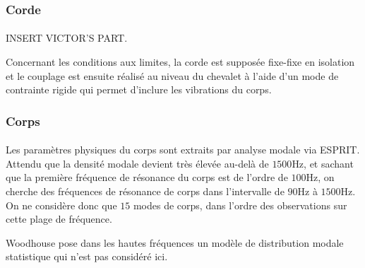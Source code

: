 \subsubsection{Corde}
  \paragraph{}
  \begin{huge}
    INSERT VICTOR'S PART.
  \end{huge}
  

  Concernant les conditions aux limites, la corde est supposée fixe-fixe
en isolation et le couplage est ensuite réalisé au niveau du chevalet à l'aide
d'un mode de contrainte rigide qui permet d'inclure les vibrations du corps.

\subsubsection{Corps}

  \paragraph{}
  Les paramètres physiques du corps sont extraits par analyse modale via ESPRIT.
Attendu que la densité modale devient très élevée au-delà de \( \si{1500\Hz} \),
et sachant que la première fréquence de résonance du corps est de l'ordre de
\( \si{100\Hz} \), on cherche des fréquences de résonance de corps dans
l'intervalle de \( \si{90\Hz} \) à \( \si{1500\Hz} \).
On ne considère donc que \( 15 \) modes de corps, dans l'ordre des observations
sur cette plage de fréquence.

Woodhouse pose dans les hautes fréquences un modèle de distribution modale
statistique qui n'est pas considéré ici.

    
